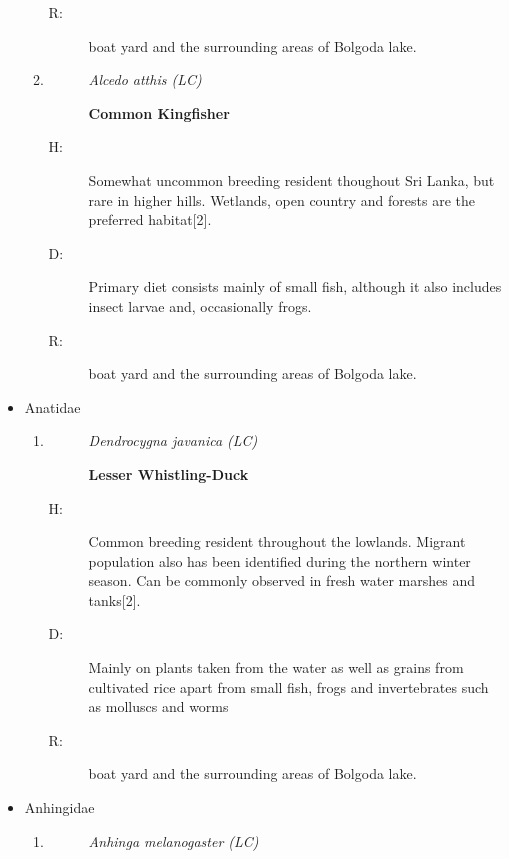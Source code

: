 \begin{itemize}
\begin{enumerate}
\begin{description}
\item[R: ]%
boat yard and the surrounding areas of Bolgoda lake.%
\end{description}%
\item%
\begin{description}%
\item[]%
\textit{Alcedo atthis (LC)}%
\item[]%
\textbf{Common Kingfisher}%
\end{description}%
\begin{description}%
\item[H: ]%
Somewhat uncommon breeding resident thoughout Sri Lanka, but rare in higher hills. Wetlands, open country and forests are the preferred habitat{[}2{]}.%
\item[D: ]%
Primary diet consists mainly of small fish, although it also includes insect larvae and, occasionally frogs.%
\item[R: ]%
boat yard and the surrounding areas of Bolgoda lake.%
\end{description}%
\end{enumerate}%
\item%
Anatidae%
\begin{enumerate}%
\item%
\begin{description}%
\item[]%
\textit{Dendrocygna javanica (LC)}%
\item[]%
\textbf{Lesser Whistling{-}Duck}%
\end{description}%
\begin{description}%
\item[H: ]%
Common breeding resident throughout the lowlands. Migrant population also has been identified during the northern winter season. Can be commonly observed in fresh water marshes and tanks{[}2{]}.%
\item[D: ]%
Mainly on plants taken from the water as well as grains from cultivated rice apart from small fish, frogs and invertebrates such as molluscs and worms%
\item[R: ]%
boat yard and the surrounding areas of Bolgoda lake.%
\end{description}%
\end{enumerate}%
\item%
Anhingidae%
\begin{enumerate}%
\item%
\begin{description}%
\item[]%
\textit{Anhinga melanogaster (LC)}%

\end{description}
\end{enumerate}
\end{itemize}
